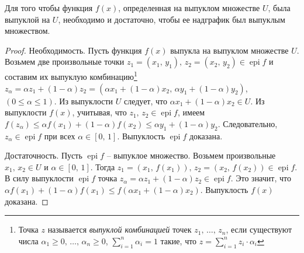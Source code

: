 \begin{theorem}
	Для того чтобы функция $f(x)$, определенная на выпуклом множестве $U$, была выпуклой на $U$, необходимо и достаточно, чтобы ее надграфик был выпуклым множеством.
	\begin{proof}
		Необходимость. Пусть функция $f(x)$ выпукла на выпуклом множестве $U$. Возьмем две произвольные точки $z_1=(x_1,\,y_1),\,z_2=(x_2,\,y_2)\in \operatorname{epi} f$ и составим их выпуклую комбинацию\footnote{Точка $z$ называется \textit{выпуклой комбинацией} точек $z_1,\,\dots,\,z_n$, если существуют числа $\alpha_1\geq0,\,\dots,\,\alpha_n\geq0$, $\sum_{i=1}^{n}\alpha_i = 1$ такие, что $z = \sum_{i=1}^{n}z_i\cdot\alpha_i$} $z_\alpha = \alpha z_1 + (1-\alpha)z_2 = (\alpha x_1 + (1-\alpha)x_2,\,\alpha y_1 + (1-\alpha)y_2)$, $(0\leq\alpha\leq1)$. Из выпуклости $U$ следует, что $\alpha x_1 + (1-\alpha)x_2 \in U$. Из выпуклости $f(x)$, учитывая, что $z_1,\,z_2\in\operatorname{epi}f$, имеем $f(z_\alpha) \leq \alpha f(x_1)+(1-\alpha)f(x_2)\leq\alpha y_1 + (1-\alpha)y_2$. Следовательно, $z_\alpha\in\operatorname{epi}f$ при всех $\alpha\in \left[0,\,1\right]$. Выпуклость $\operatorname{epi}f$ доказана.
		
		Достаточность. Пусть $\operatorname{epi}f$ -- выпуклое множество. Возьмем произвольные $x_1,\,x_2\in U$ и $\alpha\in\left[0,\,1\right]$. Тогда $z_1=(x_1,\,f(x_1)),\,z_2=(x_2,\,f(x_2))\in\operatorname{epi}f$. В силу выпуклости $\operatorname{epi}f$ точка $z_\alpha=\alpha z_1 + (1-\alpha)z_2\in\operatorname{epi}f$. Это значит, что $\alpha f(x_1) + (1-\alpha)f(x_1) \leq f\left(\alpha x_1 + (1-\alpha)x_2\right)$. Выпуклость $f(x)$ доказана.
	\end{proof}
\end{theorem}

